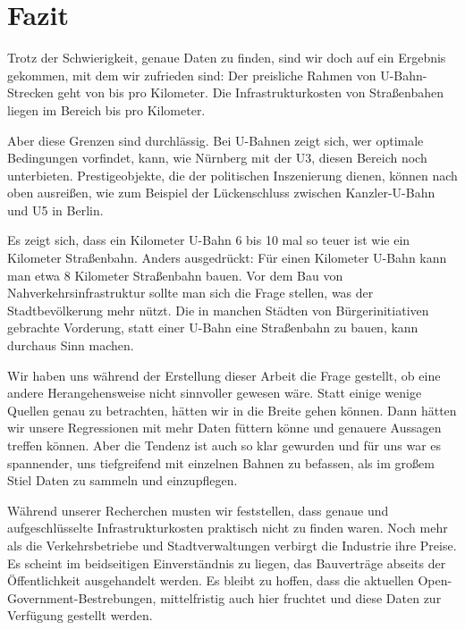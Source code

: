 \chapter{Fazit}




Trotz der Schwierigkeit, genaue Daten zu finden, sind wir doch auf ein Ergebnis gekommen, mit dem wir zufrieden sind: Der preisliche Rahmen von U-Bahn-Strecken geht von  bis  pro Kilometer. Die Infrastrukturkosten von Straßenbahen liegen im Bereich  bis  pro Kilometer.

Aber diese Grenzen sind durchlässig. Bei U-Bahnen zeigt sich, wer optimale Bedingungen vorfindet, kann, wie Nürnberg mit der U3, diesen Bereich noch unterbieten. Prestigeobjekte, die der politischen Inszenierung dienen, können nach oben ausreißen, wie zum Beispiel der Lückenschluss zwischen Kanzler-U-Bahn und U5 in Berlin. 

Es zeigt sich, dass ein Kilometer U-Bahn 6 bis 10 mal so teuer ist wie ein Kilometer Straßenbahn. Anders ausgedrückt: Für einen Kilometer U-Bahn kann man etwa 8 Kilometer Straßenbahn bauen. Vor dem Bau von Nahverkehrsinfrastruktur sollte man sich die Frage stellen, was der Stadtbevölkerung mehr nützt. Die in manchen Städten von Bürgerinitiativen gebrachte Vorderung, statt einer U-Bahn eine Straßenbahn zu bauen\cite{fzNb}, kann durchaus Sinn machen.

Wir haben uns während der Erstellung dieser Arbeit die Frage gestellt, ob eine andere Herangehensweise nicht sinnvoller gewesen wäre. Statt einige wenige Quellen genau zu betrachten, hätten wir in die Breite gehen können. Dann hätten wir unsere Regressionen mit mehr Daten füttern könne und genauere Aussagen treffen können. Aber die Tendenz ist auch so klar gewurden und für uns war es spannender, uns tiefgreifend mit einzelnen Bahnen zu befassen, als im großem Stiel Daten zu sammeln und einzupflegen.  

Während unserer Recherchen musten wir feststellen, dass genaue und aufgeschlüsselte Infrastrukturkosten praktisch nicht zu finden waren. Noch mehr als die Verkehrsbetriebe und Stadtverwaltungen verbirgt die Industrie ihre Preise. Es scheint im beidseitigen Einverständnis zu liegen, das Bauverträge abseits der Öffentlichkeit ausgehandelt werden. Es bleibt zu hoffen, dass die aktuellen Open-Government-Bestrebungen, mittelfristig auch hier fruchtet und diese Daten zur Verfügung gestellt werden. 
